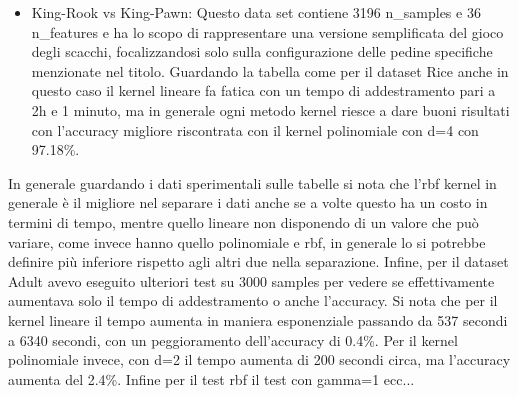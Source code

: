 \documentclass{article}
\begin{document}
\begin{itemize}
		\item King-Rook vs King-Pawn: Questo data set contiene 3196 n\_samples e 36 n\_features e ha lo scopo di rappresentare una versione semplificata del gioco degli scacchi, focalizzandosi solo sulla configurazione delle pedine specifiche menzionate nel titolo. Guardando la tabella come per il dataset Rice anche in questo caso il kernel lineare fa fatica con un tempo di addestramento pari a 2h e 1 minuto, ma in generale ogni metodo kernel riesce a dare buoni risultati con l'accuracy migliore riscontrata con il kernel polinomiale con d=4 con 97.18\%.
	\end{itemize}
    In generale guardando i dati sperimentali sulle tabelle si nota che l'rbf kernel in generale è il migliore nel separare i dati anche se a volte questo ha un costo in termini di tempo, mentre quello lineare non disponendo di un valore che può variare, come invece hanno quello polinomiale e rbf, in generale lo si potrebbe definire più inferiore rispetto agli altri due nella separazione. Infine, per il dataset Adult avevo eseguito ulteriori test su 3000 samples per vedere se effettivamente aumentava solo il tempo di addestramento o anche l'accuracy. Si nota che per il kernel lineare il tempo aumenta in maniera esponenziale passando da 537 secondi a 6340 secondi, con un peggioramento dell'accuracy di 0.4\%. Per il kernel polinomiale invece, con d=2 il tempo aumenta di 200 secondi circa, ma l'accuracy aumenta del 2.4\%. Infine per il test rbf il test con gamma=1 ecc...
\end{document}
